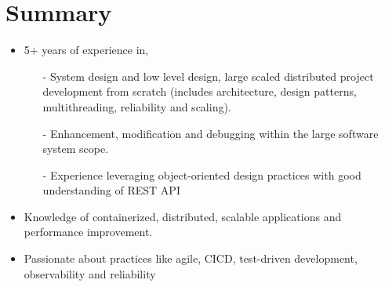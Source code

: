 \documentclass[a4paper,12pt]{article}
\begin{document}
\section{Summary}
\begin{itemize}[nosep,after=\strut, leftmargin=1em, itemsep=3pt]
	\item 5+ years of experience in,
	      \begin{itemize}
		      \item[-] System design and low level design, large scaled distributed project development from scratch (includes architecture, design patterns, multithreading, reliability and scaling).
		      \item[-] Enhancement, modification and debugging within the large software system scope.
		      \item[-] Experience leveraging object-oriented design practices with good understanding of REST API
	      \end{itemize}
	\item Knowledge of containerized, distributed, scalable applications and performance improvement.
	\item Passionate about practices like agile, CICD, test-driven development, observability and reliability
\end{itemize}

\end{document}

